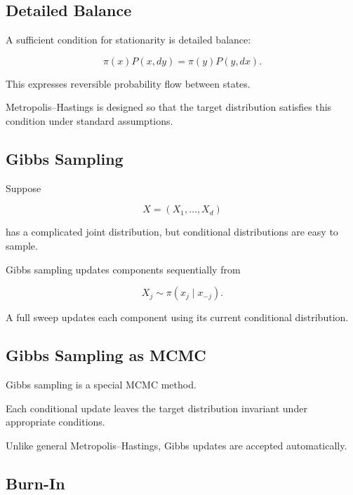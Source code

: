 \subsection{Detailed Balance}
\label{subsec:detailed-balance}

A sufficient condition for stationarity is detailed balance:

\[
\boxed{
\pi(x)
P(x,dy)
=
\pi(y)
P(y,dx).
}
\]

This expresses reversible probability flow between states.

Metropolis--Hastings is designed so that the target distribution satisfies
this condition under standard assumptions.

\subsection{Gibbs Sampling}
\label{subsec:gibbs-sampling}

Suppose

\[
X
=
(X_1,\ldots,X_d)
\]

has a complicated joint distribution, but conditional distributions are
easy to sample.

Gibbs sampling updates components sequentially from

\[
\boxed{
X_j
\sim
\pi
(
x_j
\mid
x_{-j}
).
}
\]

A full sweep updates each component using its current conditional
distribution.

\subsection{Gibbs Sampling as MCMC}
\label{subsec:gibbs-as-mcmc}

Gibbs sampling is a special MCMC method.

Each conditional update leaves the target distribution invariant under
appropriate conditions.

Unlike general Metropolis--Hastings, Gibbs updates are accepted
automatically.

\subsection{Burn-In}
\label{subsec:mcmc-burn-in}

